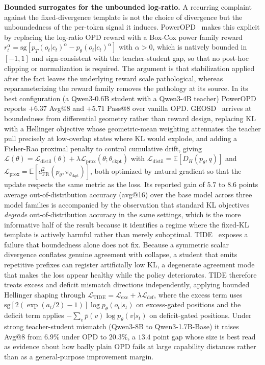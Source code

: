 \documentclass{article} %
\newcommand{\E}{\mathbb{E}}
\newcommand{\ptheta}{p_\theta}
\newcommand{\pteacher}{p_T}
\newcommand{\loss}{\mathcal{L}}
\begin{document}
\textbf{Bounded surrogates for the unbounded log-ratio.} A recurring complaint against the fixed-divergence template is not the choice of divergence but the unboundedness of the per-token signal it induces. PowerOPD~\citep{2606.17199} makes this explicit by replacing the log-ratio OPD reward with a Box-Cox power family reward $r^\alpha_t = \mathrm{sg}[\pteacher(o_t|c_t)^\alpha - \ptheta(o_t|c_t)^\alpha]$ with $\alpha > 0$, which is natively bounded in $[-1,1]$ and sign-consistent with the teacher-student gap, so that no post-hoc clipping or normalization is required. The argument is that stabilization applied after the fact leaves the underlying reward scale pathological, whereas reparameterizing the reward family removes the pathology at its source. In its best configuration (a Qwen3-0.6B student with a Qwen3-4B teacher) PowerOPD reports $+6.37$ Avg@8 and $+5.71$ Pass@8 over vanilla OPD. GEOSD~\citep{2607.06855} arrives at boundedness from differential geometry rather than reward design, replacing KL with a Hellinger objective whose geometric-mean weighting attenuates the teacher pull precisely at low-overlap states where KL would explode, and adding a Fisher-Rao proximal penalty to control cumulative drift, giving $\loss(\theta) = \loss_{\mathrm{distil}}(\theta) + \lambda \loss_{\mathrm{prox}}(\theta; \theta_{\mathrm{ckpt}})$ with $\loss_{\mathrm{distil}} = \E[D_H(\ptheta, q)]$ and $\loss_{\mathrm{prox}} = \E[d_{\mathrm{FR}}^2(\ptheta, \pi_{\theta_{\mathrm{ckpt}}})]$, both optimized by natural gradient so that the update respects the same metric as the loss. Its reported gain of $5.7$ to $8.6$ points average out-of-distribution accuracy (avg@16) over the base model across three model families is accompanied by the observation that standard KL objectives \emph{degrade} out-of-distribution accuracy in the same settings, which is the more informative half of the result because it identifies a regime where the fixed-KL template is actively harmful rather than merely suboptimal. TIDE~\citep{2608.09836} exposes a failure that boundedness alone does not fix. Because a symmetric scalar divergence conflates genuine agreement with collapse, a student that emits repetitive prefixes can register artificially low KL, a degenerate agreement mode that makes the loss appear healthy while the policy deteriorates. TIDE therefore treats excess and deficit mismatch directions independently, applying bounded Hellinger shaping through $\loss_{\mathrm{TIDE}} = \loss_{\mathrm{exc}} + \lambda \loss_{\mathrm{def}}$, where the excess term uses $\mathrm{sg}[2(\exp(a_t/2)-1)] \log \ptheta(o_t|s_t)$ on excess-gated positions and the deficit term applies $-\sum_v \bar p(v) \log \ptheta(v|s_t)$ on deficit-gated positions. Under strong teacher-student mismatch (Qwen3-8B to Qwen3-1.7B-Base) it raises Avg@8 from $6.9\%$ under OPD to $20.3\%$, a $13.4$ point gap whose size is best read as evidence about how badly plain OPD fails at large capability distances rather than as a general-purpose improvement margin.
\end{document}
